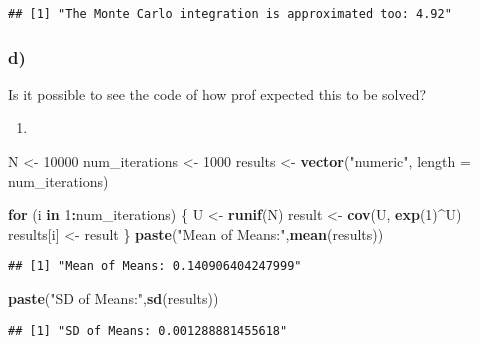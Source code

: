 \documentclass[
]{article}
\newenvironment{Shaded}{\begin{snugshade}}{\end{snugshade}}
\newcommand{\AttributeTok}[1]{\textcolor[rgb]{0.13,0.29,0.53}{#1}}
\newcommand{\ControlFlowTok}[1]{\textcolor[rgb]{0.13,0.29,0.53}{\textbf{#1}}}
\newcommand{\DecValTok}[1]{\textcolor[rgb]{0.00,0.00,0.81}{#1}}
\newcommand{\FunctionTok}[1]{\textcolor[rgb]{0.13,0.29,0.53}{\textbf{#1}}}
\newcommand{\NormalTok}[1]{#1}
\newcommand{\OtherTok}[1]{\textcolor[rgb]{0.56,0.35,0.01}{#1}}
\newcommand{\SpecialCharTok}[1]{\textcolor[rgb]{0.81,0.36,0.00}{\textbf{#1}}}
\newcommand{\StringTok}[1]{\textcolor[rgb]{0.31,0.60,0.02}{#1}}
\providecommand{\tightlist}{%
  \setlength{\itemsep}{0pt}\setlength{\parskip}{0pt}}
\begin{document}
\begin{verbatim}
## [1] "The Monte Carlo integration is approximated too: 4.92"
\end{verbatim}

\hypertarget{d-1}{%
\subsubsection{d)}\label{d-1}}

Is it possible to see the code of how prof expected this to be solved?

\begin{enumerate}
\def\labelenumi{\arabic{enumi})}
\setcounter{enumi}{3}
\tightlist
\item
\end{enumerate}

\begin{Shaded}
\begin{Highlighting}[]
\NormalTok{N }\OtherTok{\textless{}{-}} \DecValTok{10000}
\NormalTok{num\_iterations }\OtherTok{\textless{}{-}} \DecValTok{1000}
\NormalTok{results }\OtherTok{\textless{}{-}} \FunctionTok{vector}\NormalTok{(}\StringTok{"numeric"}\NormalTok{, }\AttributeTok{length =}\NormalTok{ num\_iterations)}

\ControlFlowTok{for}\NormalTok{ (i }\ControlFlowTok{in} \DecValTok{1}\SpecialCharTok{:}\NormalTok{num\_iterations) \{}
\NormalTok{  U }\OtherTok{\textless{}{-}} \FunctionTok{runif}\NormalTok{(N)}
\NormalTok{  result }\OtherTok{\textless{}{-}} \FunctionTok{cov}\NormalTok{(U, }\FunctionTok{exp}\NormalTok{(}\DecValTok{1}\NormalTok{)}\SpecialCharTok{\^{}}\NormalTok{U)}
\NormalTok{  results[i] }\OtherTok{\textless{}{-}}\NormalTok{ result}
\NormalTok{\}}
\FunctionTok{paste}\NormalTok{(}\StringTok{"Mean of Means:"}\NormalTok{,}\FunctionTok{mean}\NormalTok{(results))}
\end{Highlighting}
\end{Shaded}

\begin{verbatim}
## [1] "Mean of Means: 0.140906404247999"
\end{verbatim}

\begin{Shaded}
\begin{Highlighting}[]
\FunctionTok{paste}\NormalTok{(}\StringTok{"SD of Means:"}\NormalTok{,}\FunctionTok{sd}\NormalTok{(results))}
\end{Highlighting}
\end{Shaded}

\begin{verbatim}
## [1] "SD of Means: 0.001288881455618"
\end{verbatim}
\end{document}
